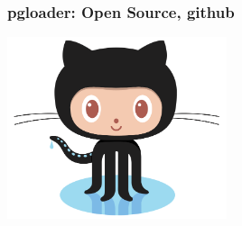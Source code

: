 \documentclass{beamer}
\begin{document}
{
  \begin{frame}[plain]
  \end{frame}
}

\begin{frame}
  \frametitle{pgloader: Open Source, github}


  \begin{center}
    \includegraphics[height=2.1in]{Octocat.png}
  \end{center}
\end{frame}
\end{document}
